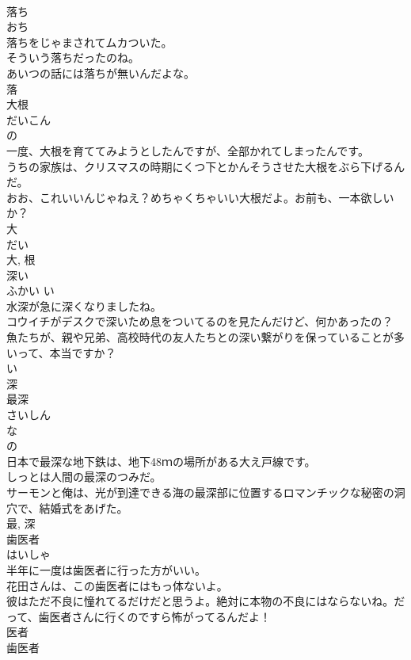 \documentclass[8pt]{extreport}
\begin{document}
\begin{CJK}{UTF8}{min}
\\	落ち	
\\	おち	
\\	落ちをじゃまされてムカついた。	
\\	そういう落ちだったのね。	
\\	あいつの話には落ちが無いんだよな。	
\\	落	
\\	大根	
\\	だいこん	
\\	の 
\\	一度、大根を育ててみようとしたんですが、全部かれてしまったんです。	
\\	うちの家族は、クリスマスの時期にくつ下とかんそうさせた大根をぶら下げるんだ。	
\\	おお、これいいんじゃねえ？めちゃくちゃいい大根だよ。お前も、一本欲しいか？	
\\	大 
\\	だい 
\\	大, 根	
\\	深い	
\\	ふかい	い 
\\	水深が急に深くなりましたね。	
\\	コウイチがデスクで深いため息をついてるのを見たんだけど、何かあったの？	
\\	魚たちが、親や兄弟、高校時代の友人たちとの深い繋がりを保っていることが多いって、本当ですか？	
\\	い 
\\	深	
\\	最深	
\\	さいしん	
\\	な 
\\	の 
\\	日本で最深な地下鉄は、地下48ｍの場所がある大え戸線です。	
\\	しっとは人間の最深のつみだ。	
\\	サーモンと俺は、光が到達できる海の最深部に位置するロマンチックな秘密の洞穴で、結婚式をあげた。	
\\	最, 深	
\\	歯医者	
\\	はいしゃ	
\\	半年に一度は歯医者に行った方がいい。	
\\	花田さんは、この歯医者にはもっ体ないよ。	
\\	彼はただ不良に憧れてるだけだと思うよ。絶対に本物の不良にはならないね。だって、歯医者さんに行くのですら怖がってるんだよ！	
\\	医者 
\\	歯医者 

\end{CJK}
\end{document}

